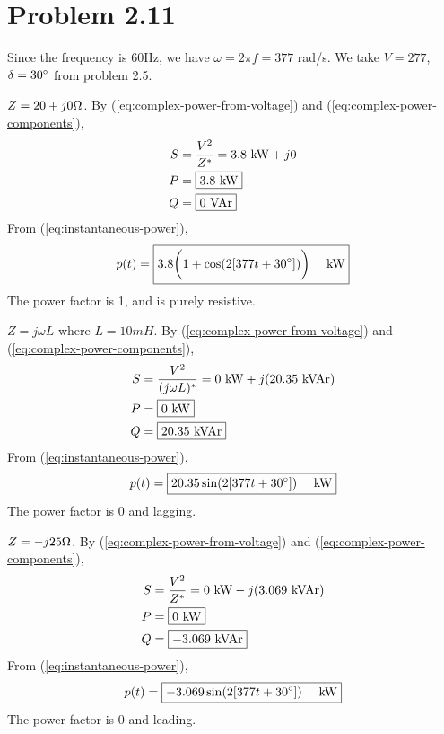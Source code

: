 \documentclass{homework}
\begin{document}
\section{Problem 2.11}
Since the frequency is 60Hz, we have $\omega = 2\pi f = 377$
rad/s. We take $V = 277$, $\delta=30\degree$ from problem 2.5.
\begin{letterenum}
    \item $Z = 20 + j0 \ohm$.
        By (\ref{eq:complex-power-from-voltage}) and
            (\ref{eq:complex-power-components}),
        \begin{align*}
            S &= \frac{V^2}{Z^*} = 3.8 \text{ kW} + j0 \\
            P &= \boxed{3.8 \text{ kW}} \\
            Q &= \boxed{0 \text{ VAr}}
        \end{align*}
        From (\ref{eq:instantaneous-power}),
        \begin{equation*}
            p(t) = \boxed{3.8 \biggl( 1 + \cos(2[377 t + 30\degree])\biggr) \quad \text{ kW}}
        \end{equation*}
        The power factor is 1, and is purely resistive.
    \item $Z = j \omega L$ where $L = 10 mH$.
        By (\ref{eq:complex-power-from-voltage}) and
            (\ref{eq:complex-power-components}),
        \begin{align*}
            S &= \frac{V^2}{(j \omega L)^*} = 0 \text{ kW} + j(20.35 \text{ kVAr}) \\
            P &= \boxed{0 \text{ kW}} \\
            Q &= \boxed{20.35 \text{ kVAr}}
        \end{align*}
        From (\ref{eq:instantaneous-power}),
        \begin{equation*}
            p(t) = \boxed{20.35 \sin(2[377 t + 30 \degree]) \quad \text{ kW}}
        \end{equation*}
        The power factor is 0 and lagging.
    \item $Z = -j 25 \ohm$.
        By (\ref{eq:complex-power-from-voltage}) and
            (\ref{eq:complex-power-components}),
        \begin{align*}
            S &= \frac{V^2}{Z^*} = 0 \text{ kW} - j(3.069 \text{ kVAr}) \\
            P &= \boxed{0 \text{ kW}} \\
            Q &= \boxed{-3.069 \text{ kVAr}}
        \end{align*}
        From (\ref{eq:instantaneous-power}),
        \begin{equation*}
            p(t) = \boxed{-3.069 \sin(2[377 t + 30 \degree]) \quad \text{ kW}}
        \end{equation*}
        The power factor is 0 and leading.
\end{letterenum}
\end{document}

